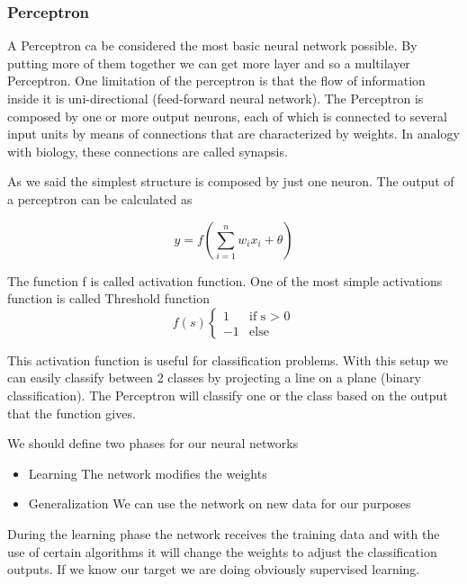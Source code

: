 \subsubsection{Perceptron}

A Perceptron ca be considered the most basic neural network possible. By putting more of them together we can get more layer and so a multilayer Perceptron. One limitation of the perceptron is that the flow of information inside it is uni-directional (feed-forward neural network). The Perceptron is composed by one or more output neurons, each of
which is connected to several input units by means of connections that are
characterized by weights.
In analogy with biology, these connections are called synapsis.

\vspace{10pt}

As we said the simplest structure is composed by just one neuron. The output of a perceptron can be calculated as

\[
y = f(\sum_{i=1}^{n}w_ix_i+\theta)
\]

The function f is called activation function. One of the most simple activations function is called Threshold function
\[
f(s)\begin{cases}
    1 &\text{if s > 0} \\
    -1 & \text{else}
    
\end{cases} \]

This activation function is useful for classification problems. With this setup we can easily classify between 2 classes by projecting a line on a plane (binary classification). The Perceptron will classify one or the class based on the output that the function gives. 

\vspace{10pt}

We should define two phases for our neural networks

\begin{itemize}
    \item Learning \ra The network modifies the weights
    \item Generalization \ra We can use the network on new data for our purposes
\end{itemize}

During the learning phase the network receives the training data and with the use of certain algorithms it will change the weights to adjust the classification outputs. If we know our target we are doing obviously supervised learning. 

